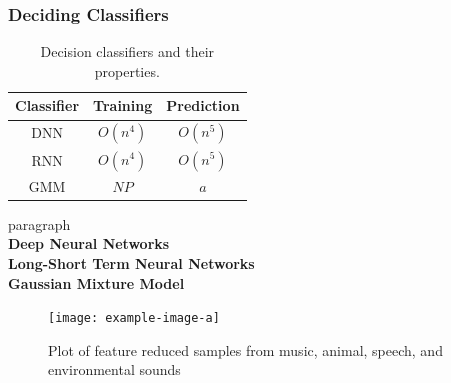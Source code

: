\subsubsection{Deciding Classifiers}
\begin{table}[h]
    \begin{tabular}{c|cc}
        Classifier & Training & Prediction \\ \hline
        DNN & $O(n^4)$ & $O(n^5)$ \\
        RNN & $O(n^4)$ & $O(n^5)$ \\
        GMM & $NP$ & $a$
    \end{tabular}
    \caption{Decision classifiers and their properties.}
    \label{tab:dec-class}
\end{table}
paragraph
\\
\textbf{Deep Neural Networks}
\\
\textbf{Long-Short Term Neural Networks}
\\
\textbf{Gaussian Mixture Model}
\\

\begin{figure}
    \centering
    \texttt{[image: example-image-a]}
    \caption{Plot of feature reduced samples from music, animal, speech, and environmental sounds}
    \label{fig:top-dist}
\end{figure}

